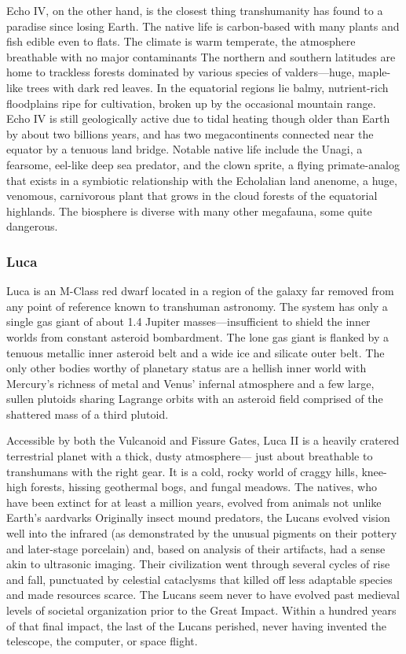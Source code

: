Echo IV, on the other hand, is the closest thing transhumanity 
has found to a paradise since losing Earth. The native life is carbon-based
with many plants and fish edible even to flats. The climate is
warm temperate, the atmosphere breathable with no major contaminants
The northern and southern latitudes are home to trackless
forests dominated by various species of valders—huge, maple-like 
trees with dark red leaves. In the equatorial regions lie balmy, nutrient-rich
floodplains ripe for cultivation, broken up by the occasional
mountain range. Echo IV is still geologically active due to tidal heating
though older than Earth by about two billions years, and has
two megacontinents connected near the equator by a tenuous land 
bridge. Notable native life include the Unagi, a fearsome, eel-like 
deep sea predator, and the clown sprite, a flying primate-analog that 
exists in a symbiotic relationship with the Echolalian land anenome, 
a huge, venomous, carnivorous plant that grows in the cloud forests 
of the equatorial highlands. The biosphere is diverse with many 
other megafauna, some quite dangerous.

\subsubsection{Luca}

Luca is an M-Class red dwarf located in a region of the galaxy 
far removed from any point of reference known to transhuman 
astronomy. The system has only a single gas giant of about 1.4 Jupiter
masses—insufficient to shield the inner worlds from constant
asteroid bombardment. The lone gas giant is flanked by a tenuous 
metallic inner asteroid belt and a wide ice and silicate outer belt. 
The only other bodies worthy of planetary status are a hellish inner 
world with Mercury's richness of metal and Venus' infernal atmosphere
and a few large, sullen plutoids sharing Lagrange orbits with
an asteroid field comprised of the shattered mass of a third plutoid.

Accessible by both the Vulcanoid and Fissure Gates, Luca II is a 
heavily cratered terrestrial planet with a thick, dusty atmosphere—
just about breathable to transhumans with the right gear. It is a cold, 
rocky world of craggy hills, knee-high forests, hissing geothermal 
bogs, and fungal meadows. The natives, who have been extinct for at 
least a million years, evolved from animals not unlike Earth's aardvarks
Originally insect mound predators, the Lucans evolved vision
well into the infrared (as demonstrated by the unusual pigments on 
their pottery and later-stage porcelain) and, based on analysis of their 
artifacts, had a sense akin to ultrasonic imaging. Their civilization 
went through several cycles of rise and fall, punctuated by celestial 
cataclysms that killed off less adaptable species and made resources 
scarce. The Lucans seem never to have evolved past medieval levels 
of societal organization prior to the Great Impact. Within a hundred 
years of that final impact, the last of the Lucans perished, never 
having invented the telescope, the computer, or space flight.

